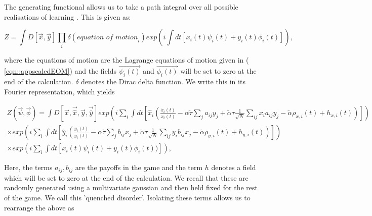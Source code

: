\documentclass[.../main.tex]{subfiles}
\begin{document}
	The generating functional allows us to take a path integral over all possible realisations of
	learning \cite{Mezard1986}. This is given as:

	\begin{equation}
		Z = \int D[\Vec{x}, \Vec{y}] \prod_i \delta(\textit{equation of motion}_i) exp(i
		\int dt[x_i(t) \psi_i(t) + y_i(t) \phi_i(t)]), 
	\end{equation}

	where the equations of motion are the Lagrange equations of motion given in (
	\ref{eqn::appscaledEOM}) and
	the fields $\Vec{\psi_i(t)}$ and $\Vec{\phi_i(t)}$ will be set to zero at the end of the
	calculation. $\delta$ denotes the Dirac delta function. We write this in its Fourier
	representation, which yields	

	\begin{equation}
		\begin{split}
	\label{eqn::appgeneratingfunctional}
		Z(\Vec{\psi}, \Vec{\phi}) = \int D[\Vec{x}, \Vec{\hat{x}}, \Vec{y}, \Vec{\hat{y}}] exp(i \sum_i \int dt[\hat{x}_i
		(\frac{\dot{x_i}(t)}{x_i(t)} - \alpha \tilde{\tau} \sum_{j} a_
			{ij} 
			y_j +
			\tilde{\alpha} \tau \frac{1}{\sqrt{N}} \sum_{i j} x_i a_{ij} y_j
			- \tilde{\alpha} \rho_{x, i}(t) + h_{x, i}(t))]) 
			\\
			\times exp(i \sum_i \int dt[\hat{y}_i
		(\frac{\dot{y_i}(t)}{y_i(t)} - \alpha \tilde{\tau} \sum_{j} b_
			{ij} 
			x_j +
			\tilde{\alpha} \tau \frac{1}{\sqrt{N}} \sum_{i j} y_i b_{ij} x_j
			- \tilde{\alpha} \rho_{y, i}(t)+ h_{y, i}(t))])\\
			\times exp(i \sum_i
		\int dt[x_i(t) \psi_i(t) + y_i(t) \phi_i(t))]),
	\end{split}
	\end{equation}

	Here, the terms $a_{ij}, b_{ij}$ are the payoffs in the game and the term $h$ denotes a field
	which will be set to zero at the end of the calculation. We recall that these are randomly
	generated using a multivariate gaussian and then held fixed for the rest of the game. We call
	this 'quenched disorder'. Isolating these terms allows us to rearrange the above as
\end{document}
